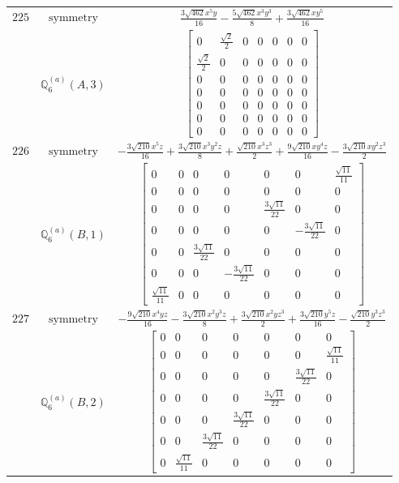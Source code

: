 \documentclass[fleqn,8pt,landscape]{jsarticle}
\begin{document}
\begin{longtable}{ccc}
$ 225 $ & $ \text{symmetry} $ & $ \frac{3 \sqrt{462} x^{5} y}{16} - \frac{5 \sqrt{462} x^{3} y^{3}}{8} + \frac{3 \sqrt{462} x y^{5}}{16} $ \\
$  $ & $ \mathbb{Q}_{6}^{(a)}(A,3) $ & $ \begin{bmatrix} 0 & \frac{\sqrt{2}}{2} & 0 & 0 & 0 & 0 & 0 \\ \frac{\sqrt{2}}{2} & 0 & 0 & 0 & 0 & 0 & 0 \\ 0 & 0 & 0 & 0 & 0 & 0 & 0 \\ 0 & 0 & 0 & 0 & 0 & 0 & 0 \\ 0 & 0 & 0 & 0 & 0 & 0 & 0 \\ 0 & 0 & 0 & 0 & 0 & 0 & 0 \\ 0 & 0 & 0 & 0 & 0 & 0 & 0 \end{bmatrix} $ \\ \hline
$ 226 $ & $ \text{symmetry} $ & $ - \frac{3 \sqrt{210} x^{5} z}{16} + \frac{3 \sqrt{210} x^{3} y^{2} z}{8} + \frac{\sqrt{210} x^{3} z^{3}}{2} + \frac{9 \sqrt{210} x y^{4} z}{16} - \frac{3 \sqrt{210} x y^{2} z^{3}}{2} $ \\
$  $ & $ \mathbb{Q}_{6}^{(a)}(B,1) $ & $ \begin{bmatrix} 0 & 0 & 0 & 0 & 0 & 0 & \frac{\sqrt{11}}{11} \\ 0 & 0 & 0 & 0 & 0 & 0 & 0 \\ 0 & 0 & 0 & 0 & \frac{3 \sqrt{11}}{22} & 0 & 0 \\ 0 & 0 & 0 & 0 & 0 & - \frac{3 \sqrt{11}}{22} & 0 \\ 0 & 0 & \frac{3 \sqrt{11}}{22} & 0 & 0 & 0 & 0 \\ 0 & 0 & 0 & - \frac{3 \sqrt{11}}{22} & 0 & 0 & 0 \\ \frac{\sqrt{11}}{11} & 0 & 0 & 0 & 0 & 0 & 0 \end{bmatrix} $ \\ \hline
$ 227 $ & $ \text{symmetry} $ & $ - \frac{9 \sqrt{210} x^{4} y z}{16} - \frac{3 \sqrt{210} x^{2} y^{3} z}{8} + \frac{3 \sqrt{210} x^{2} y z^{3}}{2} + \frac{3 \sqrt{210} y^{5} z}{16} - \frac{\sqrt{210} y^{3} z^{3}}{2} $ \\
$  $ & $ \mathbb{Q}_{6}^{(a)}(B,2) $ & $ \begin{bmatrix} 0 & 0 & 0 & 0 & 0 & 0 & 0 \\ 0 & 0 & 0 & 0 & 0 & 0 & \frac{\sqrt{11}}{11} \\ 0 & 0 & 0 & 0 & 0 & \frac{3 \sqrt{11}}{22} & 0 \\ 0 & 0 & 0 & 0 & \frac{3 \sqrt{11}}{22} & 0 & 0 \\ 0 & 0 & 0 & \frac{3 \sqrt{11}}{22} & 0 & 0 & 0 \\ 0 & 0 & \frac{3 \sqrt{11}}{22} & 0 & 0 & 0 & 0 \\ 0 & \frac{\sqrt{11}}{11} & 0 & 0 & 0 & 0 & 0 \end{bmatrix} $ \\ \hline

\end{longtable}
\end{document}
